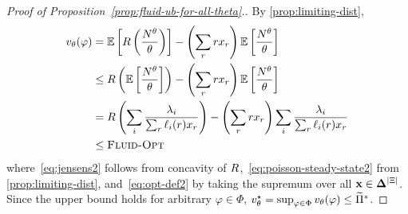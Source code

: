 \documentclass[12pt]{article}
\begin{document}
{%
\begin{proof}[Proof of Proposition~\ref{prop:fluid-ub-for-all-theta}.]
By \cref{prop:limiting-dist},
\begin{align}
v_{\theta}(\varphi) &= \mathbb{E}\left[R\left(\frac{N^\theta}{\theta}\right)\right] - \left(\sum_r rx_r\right)\mathbb{E}\left[\frac{N^\theta}{\theta}\right] \\ &\leq R\left(\mathbb{E}\left[\frac{N^\theta}{\theta}\right]\right)- \left(\sum_r rx_r\right)\mathbb{E}\left[\frac{N^\theta}{\theta}\right] \label{eq:jensens2}\\
&= R\left(\sum_i \frac{\lambda_i}{\sum_r \ell_i(r) x_r}\right)- \left(\sum_r rx_r\right)\sum_i \frac{\lambda_i}{\sum_r \ell_i(r) x_r} \label{eq:poisson-steady-state2} \\
&\leq \textsc{Fluid-Opt} \label{eq:opt-def2}
\end{align}
where~\eqref{eq:jensens2} follows from concavity of $R$,~\eqref{eq:poisson-steady-state2} from \cref{prop:limiting-dist}, and~\eqref{eq:opt-def2} by taking the supremum over all $\mathbf{x} \in \boldsymbol{\Delta}^{|\Xi|}$. Since the upper bound holds for arbitrary $\varphi \in \Phi$, $v^\star_\theta = \sup_{\varphi \in \Phi} v_{\theta}(\varphi) \leq \widetilde{\Pi}^*$.
\end{proof}}
\end{document}
